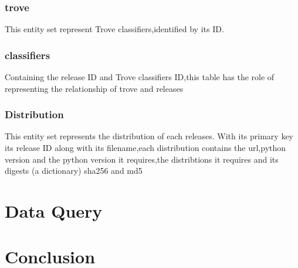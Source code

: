 \documentclass[a4paper,12pt]{article}
\begin{document}
\subsubsection{trove}
This entity set represent Trove classifiers,identified by its ID.
\subsubsection{classifiers}
Containing the release ID and Trove classifiers ID,this table has the role of representing the relationship of trove and releases
\subsubsection{Distribution}
This entity set represents the distribution of each releases. With its primary key its release ID along with its filename,each distribution contains the url,python version and the python version it requires,the distribtions it requires and its digests (a dictionary) sha256 and md5


\section{Data Query}

\section{Conclusion}

\begin{thebibliography}{69}
\end{thebibliography}
\end{document}
